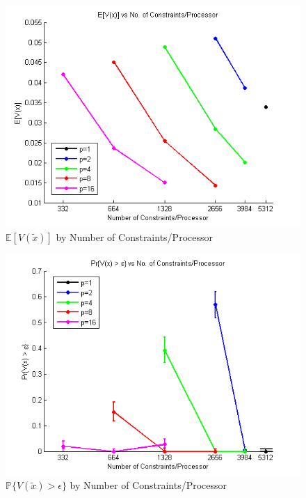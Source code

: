 \documentclass[12pt]{article}
\begin{document}
\begin{figure}[ht]
	\centering
		\includegraphics{../plot/figs/expviolprob_numconstraint.png}
	\caption{$\mathbb{E}[V(\tilde{x})]$ by Number of Constraints/Processor}
	\label{fig:expviolprob_numconstraint}
\end{figure}

\begin{figure}[ht]
	\centering
		\includegraphics{../plot/figs/probviolprobgreateps_numconstraint.png}
	\caption{$\mathbb{P}\{V(\tilde{x}) > \epsilon \}$ by Number of Constraints/Processor}
	\label{fig:probviolprobgreateps_numconstraint}
\end{figure}
\end{document}

